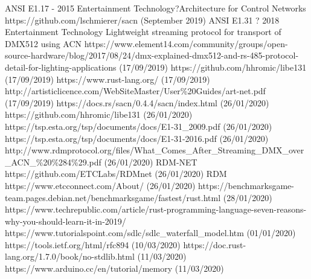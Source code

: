 \documentclass[11pt,a4paper]{report}
\begin{document}
	\begin{thebibliography}{9}
		ANSI E1.17 - 2015 Entertainment Technology?Architecture for Control Networks
		https://github.com/lschmierer/sacn (September 2019)
		ANSI E1.31 ? 2018 Entertainment Technology Lightweight streaming protocol for transport of DMX512 using ACN
		https://www.element14.com/community/groups/open-source-hardware/blog/2017/08/24/dmx-explained-dmx512-and-rs-485-protocol-detail-for-lighting-applications (17/09/2019)
		https://github.com/hhromic/libe131 (17/09/2019)
		https://www.rust-lang.org/ (17/09/2019)
		http://artisticlicence.com/WebSiteMaster/User\%20Guides/art-net.pdf (17/09/2019)
		https://docs.rs/sacn/0.4.4/sacn/index.html
		(26/01/2020)
		https://github.com/hhromic/libe131
		(26/01/2020)
		https://tsp.esta.org/tsp/documents/docs/E1-31\_2009.pdf
		(26/01/2020)
		https://tsp.esta.org/tsp/documents/docs/E1-31-2016.pdf
		(26/01/2020)
		http://www.rdmprotocol.org/files/What\_Comes\_After\_Streaming\_DMX\_over\_ACN\_\%20\%284\%29.pdf (26/01/2020)
		RDM-NET
		https://github.com/ETCLabs/RDMnet (26/01/2020)
		RDM
		https://www.etcconnect.com/About/ (26/01/2020)
		https://benchmarksgame-team.pages.debian.net/benchmarksgame/fastest/rust.html (28/01/2020)
		https://www.techrepublic.com/article/rust-programming-language-seven-reasons-why-you-should-learn-it-in-2019/
		https://www.tutorialspoint.com/sdlc/sdlc\_waterfall\_model.htm (01/01/2020)
		https://tools.ietf.org/html/rfc894 (10/03/2020)
		https://doc.rust-lang.org/1.7.0/book/no-stdlib.html (11/03/2020)
		https://www.arduino.cc/en/tutorial/memory (11/03/2020)
		
	\end{thebibliography}
	
\end{document}
